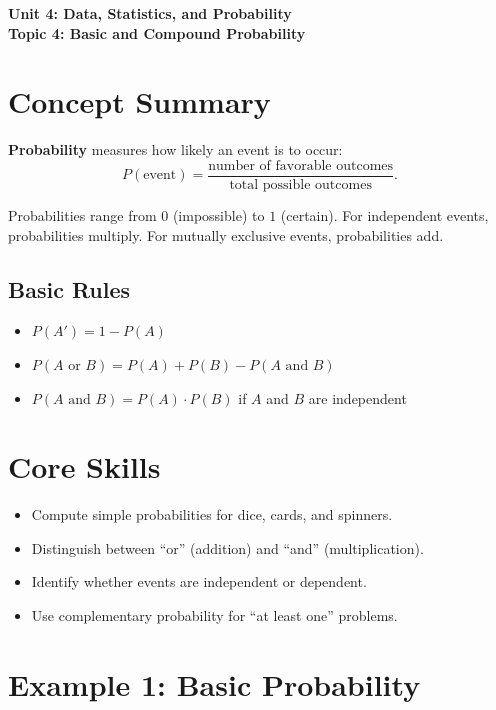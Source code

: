 \documentclass[14pt]{extarticle}
\begin{document}
\raggedright
{}

\begin{center}
    \LARGE \textbf{Unit 4: Data, Statistics, and Probability} \\[6pt]
    \Large \textbf{Topic 4: Basic and Compound Probability}
\end{center}

\vspace{1em}

\section*{Concept Summary}

\textbf{Probability} measures how likely an event is to occur:
\[
P(\text{event}) = \frac{\text{number of favorable outcomes}}{\text{total possible outcomes}}.
\]

Probabilities range from \(0\) (impossible) to \(1\) (certain).  
For independent events, probabilities multiply.  
For mutually exclusive events, probabilities add.

\subsection*{Basic Rules}
\begin{itemize}
  \item \(P(A') = 1 - P(A)\)
  \item \(P(A\text{ or }B) = P(A) + P(B) - P(A\text{ and }B)\)
  \item \(P(A\text{ and }B) = P(A)\cdot P(B)\) if \(A\) and \(B\) are independent
\end{itemize}

\section*{Core Skills}
\begin{itemize}
  \item Compute simple probabilities for dice, cards, and spinners.
  \item Distinguish between “or” (addition) and “and” (multiplication).
  \item Identify whether events are independent or dependent.
  \item Use complementary probability for “at least one” problems.
\end{itemize}

\section*{Example 1: Basic Probability}
\end{document}
